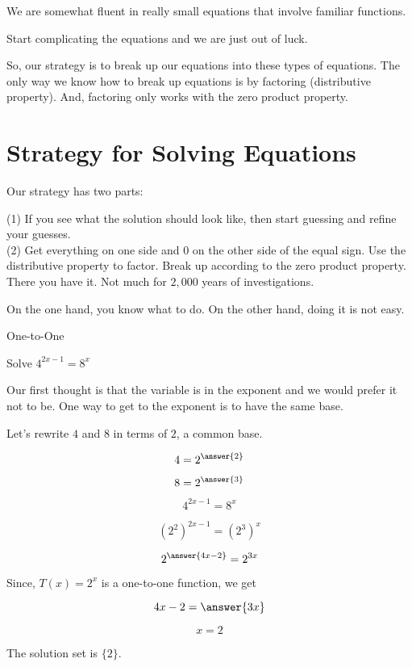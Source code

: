 \documentclass{ximera}
\begin{document}
We are somewhat fluent in really small equations that involve familiar functions.  



Start complicating the equations and we are just out of luck.


So, our strategy is to break up our equations into these types of equations.  The only way we know how to break up equations is by factoring (distributive property).  And, factoring only works with the zero product property.



\section{Strategy for Solving Equations}


Our strategy has two parts:


(1) If you see what the solution should look like, then start guessing and refine your guesses.\\
(2) Get everything on one side and $0$ on the other side of the equal sign. Use the distributive property to factor.  Break up according to the zero product property. \\




There you have it. Not much for $2,000$ years of investigations.

On the one hand, you know what to do.  On the other hand, doing it is not easy.








\begin{example} One-to-One


Solve $4^{2x-1} = 8^x$



\begin{explanation}

Our first thought is that the variable is in the exponent and we would prefer it not to be.  One way to get to the exponent is to have the same base.

Let's rewrite $4$ and $8$ in terms of $2$, a common base.

\[  4 = 2^{\answer{2}} \]

\[  8 = 2^{\answer{3}} \]



\[  4^{2x-1} = 8^x  \]

\[  (2^2)^{2x-1} = (2^3)^x  \]

\[  2^{\answer{4x-2}} = 2^{3x}  \]


Since, $T(x) = 2^x$ is a one-to-one function, we get


\[  4x-2  = \answer{3x}   \]


\[ x = 2 \]

The solution set is $\{ 2 \}$.


\end{explanation}
\end{example}
\end{document}
